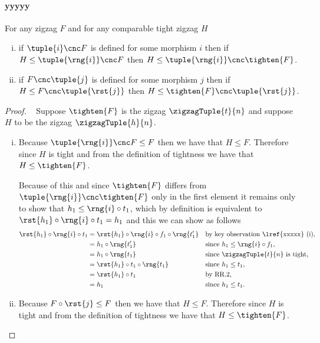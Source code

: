 \paragraph*{yyyyy}
\begin{lemma}
For any zigzag $F$ and for any comparable tight zigzag $H$
\begin{enumerate}[(i)]
\item if $\tuple{i} \cnc F$ is defined for some morphism $i$ then
if  $H \leq \tuple{\rng{i}} \cnc F$
then $H \leq  \tuple{\rng{i}} \cnc \tighten{F}$.
\item if $F\cnc\tuple{j}$ is defined for some morphism $j$ then
if  $H \leq F \cnc \tuple{\rst{j}}$
then $H \leq  \tighten{F} \cnc \tuple{\rst{j}}$.
\end{enumerate}
\end{lemma}
\begin{proof}
~
Suppose $\tighten{F}$ is the zigzag $\zigzagTuple{t}{n}$
and suppose $H$ to be the zigzag $\zigzagTuple{h}{n}$.
\begin{enumerate}[(i)]
\item %
Because $\tuple{\rng{i}} \cnc F \leq F$ then we have that
$H \leq F$. Therefore since $H$ is tight and from the definition
of tightness we have that
$H \leq \tighten{F}$.

Because of this and since $\tighten{F}$ differs from
$\tuple{\rng{i}} \cnc \tighten{F}$ only in the first element
it remains only to show that
$h_1 \leq \rng{i} \circ t_1$, which by definition
is equivalent to $\rst{h_1} \circ \rng{i} \circ t_1 = h_1$
and this we  can show as follows
\begin{align*}
\rst{h_1} \circ \rng{i} \circ t_1
  &= \rst{h_1} \circ \rng{i} \circ f_1 \circ \rng{t'_1}
  && \mbox{by key observation \lref{xxxxx} (i),}\\
  &= h_1 \circ \rng{t'_1} 
  && \mbox{since $h_1 \leq \rng{i} \circ f_1$,}\\
  &= h_1 \circ \rng{t_1}
  && \mbox{since $\zigzagTuple{t}{n}$ is tight, }\\
  &= \rst{h_1} \circ t_1 \circ \rng{t_1}
  && \mbox{since $h_1 \leq t_1$,}\\
  &= \rst{h_1} \circ t_1
  && \mbox{by RR.2,}\\
  &= h_1
  &&\mbox{since $h_1 \leq t_1$.}
\end{align*}

\item %
Because $F \circ \rst{j} \leq F$ then we have that $H \leq F$.
Therefore since $H$ is tight and from the definition
of tightness we have that $H \leq \tighten{F}$.


\end{enumerate}
\end{proof}
